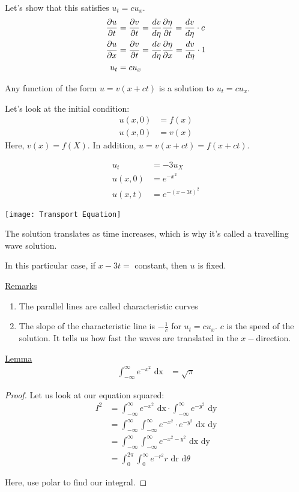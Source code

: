   Let's show that this satisfies $u_t = cu_x$.
  \begin{align}
    \frac{\partial u}{\partial t} & = \frac{\partial v}{\partial t} = \frac{dv}{d\eta} \frac{\partial \eta}{\partial t} = \frac{dv}{d \eta} \cdot c\\
    \frac{\partial u}{\partial x} & = \frac{\partial v}{\partial t} = \frac{dv}{d \eta} \frac{\partial \eta}{\partial x} = \frac{dv}{d \eta} \cdot 1\\
    u_t & = cu_x
  \end{align}

  Any function of the form $u = v(x + ct)$ is a solution to $u_t = cu_x$.

  Let's look at the initial condition:
  \begin{align}
    u(x, 0) & = f(x)\\
    u(x, 0) & = v(x)
  \end{align}
  Here, $v(x) = f(X)$. In addition, $u = v(x + ct) = f(x + ct)$.

  \ex%
  \begin{align}
    u_t & = -3u_X\\
    u(x, 0) & = e^{-x^2}\\
    u(x, t) & = e^{-(x - 3t)^2}
  \end{align}

\begin{center}
  \texttt{[image: Transport Equation]}
\end{center}

The solution translates as time increases, which is why it's called a travelling wave solution.

In this particular case, if $x - 3t = $ constant, then $u$ is fixed.

\underline{Remarks}
%
\begin{enumerate}
  \item The parallel lines are called characteristic curves
  \item The slope of the characteristic line is $-\frac{1}{c}$ for $u_t = cu_x$.
  $c$ is the speed of the solution.
  It tells us how fast the waves are translated in the $x-$direction.
\end{enumerate}

\underline{Lemma}
%
\begin{align}
  \int^\infty_{-\infty} e^{-x^2} \text{ dx} & = \sqrt \pi
\end{align}

\begin{proof}
  Let us look at our equation squared:
  \begin{align}
    I^2 & =
    \int^\infty_{-\infty} e^{-x^2} \text{ dx} \cdot
    \int^\infty_{-\infty} e^{-y^2} \text{ dy}\\
    & = \int^\infty_{-\infty} \int^\infty_{-\infty}
    e^{-x^2} \cdot e^{-y^2} \text{ dx dy}\\
    & =
    \int^\infty_{-\infty} \int^\infty_{-\infty}
    e^{-x^2 - y^2} \text{ dx dy}\\
    & =
    \int^{2 \pi}_{0} \int^\infty_0
    e^{-r^2} r \text{ dr d}\theta
  \end{align}

  Here, use polar to find our integral.
\end{proof}
